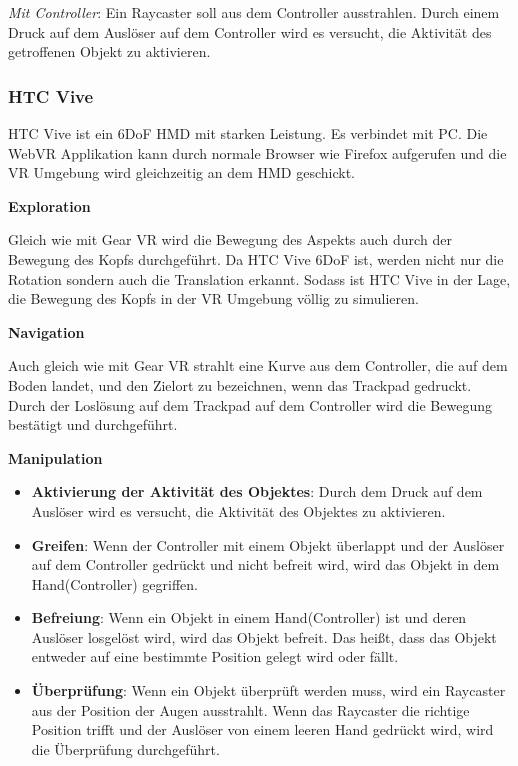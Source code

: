   \textsl{Mit Controller}: Ein Raycaster soll aus dem Controller ausstrahlen. Durch einem Druck auf dem Auslöser auf dem Controller wird es versucht, die Aktivität des getroffenen Objekt zu aktivieren.
  
 \subsubsection{HTC Vive}
 HTC Vive ist ein 6DoF HMD mit starken Leistung. Es verbindet mit PC. Die WebVR Applikation kann durch normale Browser wie Firefox aufgerufen und die VR Umgebung wird gleichzeitig an dem HMD geschickt.
 
  \textbf{Exploration}
  
  Gleich wie mit Gear VR wird die Bewegung des Aspekts auch durch der Bewegung des Kopfs durchgeführt. Da HTC Vive 6DoF ist, werden nicht nur die Rotation sondern auch die Translation  erkannt. Sodass ist HTC Vive in der Lage, die Bewegung des Kopfs in der VR Umgebung völlig zu simulieren.
  
  \textbf{Navigation}
  
  Auch gleich wie mit Gear VR strahlt eine Kurve aus dem Controller, die auf dem Boden landet, und den Zielort zu bezeichnen, wenn das Trackpad gedruckt. Durch der Loslösung auf dem Trackpad auf dem Controller wird die Bewegung bestätigt und durchgeführt.
  
  \textbf{Manipulation}
  \begin{itemize}
  \item \textbf{Aktivierung der Aktivität des Objektes}: Durch dem Druck auf dem Auslöser wird es versucht, die Aktivität des Objektes zu aktivieren.
  \item \textbf{Greifen}: Wenn der Controller mit einem Objekt überlappt und der Auslöser auf dem Controller gedrückt und nicht befreit wird, wird das Objekt in dem Hand(Controller) gegriffen.
  \item \textbf{Befreiung}: Wenn ein Objekt in einem Hand(Controller) ist und deren Auslöser losgelöst wird, wird das Objekt befreit. Das heißt, dass das Objekt entweder auf eine bestimmte Position gelegt wird oder fällt.
  \item \textbf{Überprüfung}: Wenn ein Objekt überprüft werden muss, wird ein Raycaster aus der Position der Augen ausstrahlt. Wenn das Raycaster die richtige Position trifft und der Auslöser von einem leeren Hand gedrückt wird, wird die Überprüfung durchgeführt.
  \end{itemize}
  
